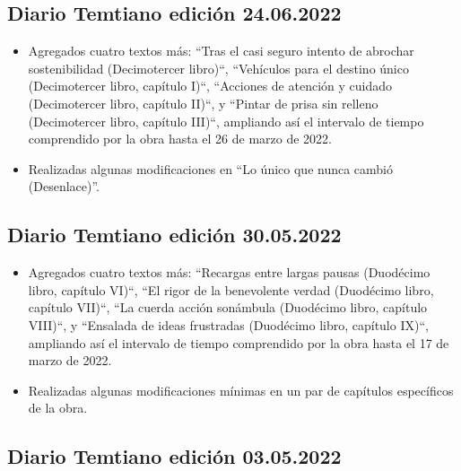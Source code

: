 \documentclass[
]{book}
\begin{document}
\hypertarget{diario-temtiano-ediciuxf3n-24.06.2022}{%
\subsection*{Diario Temtiano edición 24.06.2022}\label{diario-temtiano-ediciuxf3n-24.06.2022}}

\begin{itemize}
\item
  Agregados cuatro textos más: ``Tras el casi seguro intento de abrochar sostenibilidad (Decimotercer libro)``, ``Vehículos para el destino único (Decimotercer libro, capítulo I)``, ``Acciones de atención y cuidado (Decimotercer libro, capítulo II)``, y ``Pintar de prisa sin relleno (Decimotercer libro, capítulo III)``, ampliando así el intervalo de tiempo comprendido por la obra hasta el 26 de marzo de 2022.
\item
  Realizadas algunas modificaciones en ``Lo único que nunca cambió (Desenlace)''.
\end{itemize}

\hypertarget{diario-temtiano-ediciuxf3n-30.05.2022}{%
\subsection*{Diario Temtiano edición 30.05.2022}\label{diario-temtiano-ediciuxf3n-30.05.2022}}

\begin{itemize}
\item
  Agregados cuatro textos más: ``Recargas entre largas pausas (Duodécimo libro, capítulo VI)``, ``El rigor de la benevolente verdad (Duodécimo libro, capítulo VII)``, ``La cuerda acción sonámbula (Duodécimo libro, capítulo VIII)``, y ``Ensalada de ideas frustradas (Duodécimo libro, capítulo IX)``, ampliando así el intervalo de tiempo comprendido por la obra hasta el 17 de marzo de 2022.
\item
  Realizadas algunas modificaciones mínimas en un par de capítulos específicos de la obra.
\end{itemize}

\hypertarget{diario-temtiano-ediciuxf3n-03.05.2022}{%
\subsection*{Diario Temtiano edición 03.05.2022}\label{diario-temtiano-ediciuxf3n-03.05.2022}}
\end{document}
